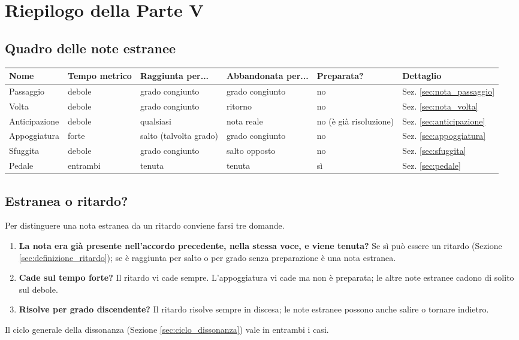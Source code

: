 \chapter{Riepilogo della Parte V}
\label{chap:riepilogo_v}

\section{Quadro delle note estranee}
\label{sec:sintesi_note_estranee}

\begin{center}
\small
\begin{tabularx}{\linewidth}{lLLLLL}
\toprule
\textbf{Nome} & \textbf{Tempo metrico} & \textbf{Raggiunta per...} & \textbf{Abbandonata per...} & \textbf{Preparata?} & \textbf{Dettaglio} \\
\midrule
Passaggio & debole & grado congiunto & grado congiunto & no & Sez. \ref{sec:nota_passaggio} \\
Volta & debole & grado congiunto & ritorno & no & Sez. \ref{sec:nota_volta} \\
Anticipazione & debole & qualsiasi & nota reale & no (è già risoluzione) & Sez. \ref{sec:anticipazione} \\
Appoggiatura & forte & salto (talvolta grado) & grado congiunto & no & Sez. \ref{sec:appoggiatura} \\
Sfuggita & debole & grado congiunto & salto opposto & no & Sez. \ref{sec:sfuggita} \\
Pedale & entrambi & tenuta & tenuta & sì & Sez. \ref{sec:pedale} \\
\bottomrule
\end{tabularx}
\end{center}

\section{Estranea o ritardo?}
\label{sec:estranea_o_ritardo}

Per distinguere una nota estranea da un ritardo conviene farsi tre domande.

\begin{enumerate}
	\item \textbf{La nota era già presente nell'accordo precedente, nella stessa voce, e viene tenuta?} Se sì può essere un ritardo (Sezione \ref{sec:definizione_ritardo}); se è raggiunta per salto o per grado senza preparazione è una nota estranea.
	\item \textbf{Cade sul tempo forte?} Il ritardo vi cade sempre. L'appoggiatura vi cade ma non è preparata; le altre note estranee cadono di solito sul debole.
	\item \textbf{Risolve per grado discendente?} Il ritardo risolve sempre in discesa; le note estranee possono anche salire o tornare indietro.
\end{enumerate}

Il ciclo generale della dissonanza (Sezione \ref{sec:ciclo_dissonanza}) vale in entrambi i casi.

